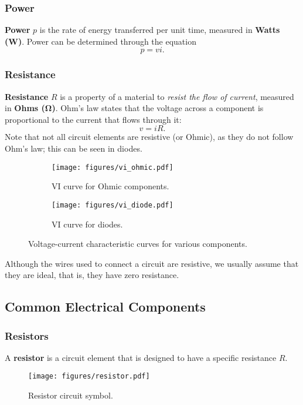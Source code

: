 \documentclass{article}
\begin{document}
\subsubsection{Power}
\textbf{Power} \(p\) is the rate of energy transferred per unit time, measured in \textbf{Watts (\unit{W})}.
Power can be determined through the equation
\begin{equation*}
    p = v i.
\end{equation*}
\subsubsection{Resistance}
\textbf{Resistance} \(R\) is a property of a material to \textit{resist the flow of current}, measured in \textbf{Ohms (\unit{\ohm})}.
Ohm's law states that the voltage across a component is proportional to the current that flows through it:
\begin{equation*}
    v = i R.
\end{equation*}
Note that not all circuit elements are resistive (or Ohmic), as they
do not follow Ohm's law; this can be seen in diodes.
\begin{figure}[H]
    \centering
    \begin{subfigure}{0.47\linewidth}
        \centering
        \texttt{[image: figures/vi\_ohmic.pdf]}
        \caption{VI curve for Ohmic components.}
    \end{subfigure}
    \begin{subfigure}{0.47\linewidth}
        \centering
        \texttt{[image: figures/vi\_diode.pdf]}
        \caption{VI curve for diodes.}
    \end{subfigure}
    \caption{Voltage-current characteristic curves for various components.}
\end{figure}
Although the wires used to connect a circuit are resistive, we usually assume that they are ideal, that is,
they have zero resistance.
\subsection{Common Electrical Components}
\subsubsection{Resistors}
A \textbf{resistor} is a circuit element that is designed to have a
specific resistance \(R\).
\begin{figure}[H]
    \centering
    \texttt{[image: figures/resistor.pdf]}
    \caption{Resistor circuit symbol.} %
\end{figure}
\end{document}
